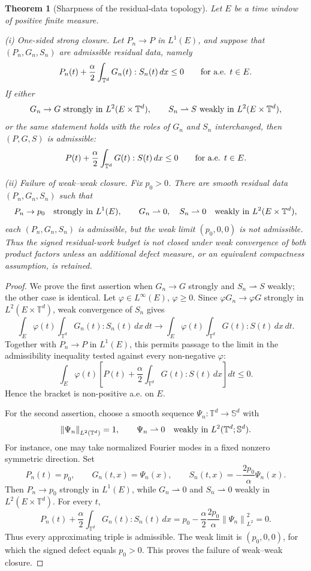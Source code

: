 \documentclass[11pt]{article}
\numberwithin{equation}{section}
\newtheorem{theorem}{Theorem}[section]
\newcommand{\T}{\mathbb T}
\newcommand{\Sym}{\mathbb S}
\newcommand{\norm}[1]{\left\lVert #1\right\rVert}
\begin{document}
\begin{theorem}[Sharpness of the residual-data topology]
\label{thm:weak-sharpness}
Let \(E\) be a time window of positive finite measure.

\emph{(i) One-sided strong closure.}
Let \(P_n\to P\) in \(L^1(E)\), and suppose that
\((P_n,G_n,S_n)\) are admissible residual data, namely
\[
  P_n(t)+\frac{\alpha}{2}\int_{\T^d}G_n(t):S_n(t)\,dx\le0
  \qquad\hbox{for a.e. }t\in E .
\]
If either
\[
  G_n\to G\hbox{ strongly in }L^2(E\times\T^d),
  \qquad
  S_n\rightharpoonup S\hbox{ weakly in }L^2(E\times\T^d),
\]
or the same statement holds with the roles of \(G_n\) and \(S_n\) interchanged,
then \((P,G,S)\) is admissible:
\[
  P(t)+\frac{\alpha}{2}\int_{\T^d}G(t):S(t)\,dx\le0
  \qquad\hbox{for a.e. }t\in E .
\]

\emph{(ii) Failure of weak--weak closure.}
Fix \(p_0>0\).  There are smooth residual data
\((P_n,G_n,S_n)\) such that
\[
  P_n\to p_0\quad\hbox{strongly in }L^1(E),
  \qquad
  G_n\rightharpoonup0,\quad S_n\rightharpoonup0
  \quad\hbox{weakly in }L^2(E\times\T^d),
\]
each \((P_n,G_n,S_n)\) is admissible, but the weak limit
\((p_0,0,0)\) is not admissible.  Thus the signed residual-work budget is not
closed under weak convergence of both product factors unless an additional
defect measure, or an equivalent compactness assumption, is retained.
\end{theorem}

\begin{proof}
We prove the first assertion when \(G_n\to G\) strongly and
\(S_n\rightharpoonup S\) weakly; the other case is identical.  Let
\(\varphi\in L^\infty(E)\), \(\varphi\ge0\).  Since
\(\varphi G_n\to\varphi G\) strongly in \(L^2(E\times\T^d)\), weak convergence
of \(S_n\) gives
\[
  \int_E\varphi(t)\int_{\T^d}G_n(t):S_n(t)\,dx\,dt
  \longrightarrow
  \int_E\varphi(t)\int_{\T^d}G(t):S(t)\,dx\,dt .
\]
Together with \(P_n\to P\) in \(L^1(E)\), this permits passage to the limit in
the admissibility inequality tested against every non-negative \(\varphi\):
\[
  \int_E\varphi(t)
  \left[
    P(t)+\frac{\alpha}{2}\int_{\T^d}G(t):S(t)\,dx
  \right]dt
  \le0 .
\]
Hence the bracket is non-positive a.e. on \(E\).

For the second assertion, choose a smooth sequence
\(\Psi_n:\T^d\to\Sym^d\) with
\[
  \norm{\Psi_n}_{L^2(\T^d)}=1,
  \qquad
  \Psi_n\rightharpoonup0\quad\hbox{weakly in }L^2(\T^d;\Sym^d).
\]
For instance, one may take normalized Fourier modes in a fixed nonzero
symmetric direction.  Set
\[
  P_n(t)=p_0,\qquad
  G_n(t,x)=\Psi_n(x),\qquad
  S_n(t,x)=-\frac{2p_0}{\alpha}\Psi_n(x).
\]
Then \(P_n\to p_0\) strongly in \(L^1(E)\), while
\(G_n\rightharpoonup0\) and \(S_n\rightharpoonup0\) weakly in
\(L^2(E\times\T^d)\).  For every \(t\),
\[
  P_n(t)+\frac{\alpha}{2}\int_{\T^d}G_n(t):S_n(t)\,dx
  =
  p_0-\frac{\alpha}{2}\frac{2p_0}{\alpha}\norm{\Psi_n}_{L^2}^2
  =0 .
\]
Thus every approximating triple is admissible.  The weak limit is
\((p_0,0,0)\), for which the signed defect equals \(p_0>0\).  This proves the
failure of weak--weak closure.
\end{proof}
\end{document}

